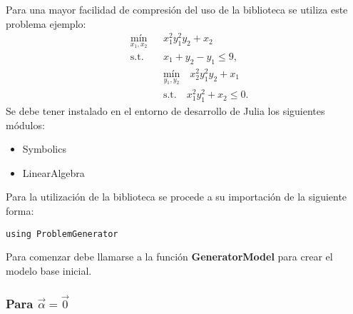 Para una mayor facilidad de compresión del uso de la biblioteca se utiliza este problema ejemplo:
\begin{equation}
    \begin{aligned}
        & \underset{x_1, x_2}{\text{mín}} 
        && x_1^2 y_1^2 y_2 + x_2 \\
        & \text{s.t.} 
        && x_1 + y_2 - y_1 \leq 9, \\
        & 
        && \underset{y_1, y_2}{\text{mín}} 
        \quad x_2^2 y_1^2 y_2 + x_1 \\
        & 
        && \text{s.t.} 
        \quad x_1^2 y_1^2 + x_2 \leq 0.
    \end{aligned}
    \label{ProblemaEjemplo}
\end{equation}
Se debe tener instalado en el entorno de desarrollo de Julia los siguientes módulos:
\begin{itemize}
    \item Symbolics 
    \item LinearAlgebra
\end{itemize}

Para la utilización de la biblioteca se procede a su importación de la siguiente forma:
\begin{lstlisting}[caption=Importar el Módulo]
    using ProblemGenerator
\end{lstlisting}

Para comenzar debe llamarse a la función \textbf{GeneratorModel} para crear el modelo base
inicial.

\subsubsection{Para $\vec{\alpha}=\vec{0}$ }

